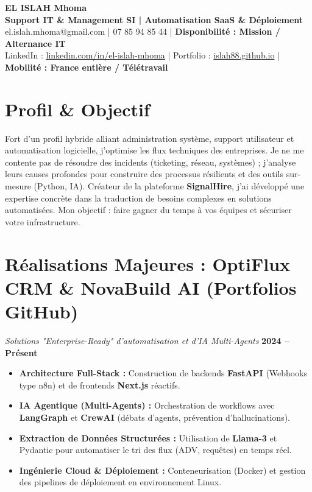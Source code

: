 \documentclass[10pt,a4paper]{article}
\begin{document}
\color{DarkGrey}

\begin{center}
    {\Huge \textbf{EL ISLAH Mhoma}}\\[0.1em] 
    {\large \textbf{\textcolor{UpClearBlue}{Support IT \& Management SI | Automatisation SaaS \& Déploiement}}}\\[0.2em]
    \small el.islah.mhoma@gmail.com | 07 85 94 85 44 | \textbf{Disponibilité : Mission / Alternance IT} \\
    \small LinkedIn : \href{https://linkedin.com/in/el-islah-mhoma/}{linkedin.com/in/el-islah-mhoma} | Portfolio : \href{https://islah88.github.io/}{islah88.github.io} | \textbf{Mobilité : France entière / Télétravail}
\end{center}
\vspace{0.1em}

\section*{Profil \& Objectif}
Fort d'un profil hybride alliant administration système, support utilisateur et automatisation logicielle, j'optimise les flux techniques des entreprises. Je ne me contente pas de résoudre des incidents (ticketing, réseau, systèmes) ; j'analyse leurs causes profondes pour construire des processus résilients et des outils sur-mesure (Python, IA). Créateur de la plateforme \textbf{SignalHire}, j'ai développé une expertise concrète dans la traduction de besoins complexes en solutions automatisées. Mon objectif : faire gagner du temps à vos équipes et sécuriser votre infrastructure.

\section*{Réalisations Majeures : OptiFlux CRM \& NovaBuild AI (Portfolios GitHub)}
\textit{Solutions "Enterprise-Ready" d'automatisation et d'IA Multi-Agents} \hfill \textbf{2024 -- Présent}
\begin{itemize}[leftmargin=1.5em, nosep, topsep=0.1em]
    \item \textbf{Architecture Full-Stack :} Construction de backends \textbf{FastAPI} (Webhooks type n8n) et de frontends \textbf{Next.js} réactifs.
    \item \textbf{IA Agentique (Multi-Agents) :} Orchestration de workflows avec \textbf{LangGraph} et \textbf{CrewAI} (débats d'agents, prévention d'hallucinations).
    \item \textbf{Extraction de Données Structurées :} Utilisation de \textbf{Llama-3} et Pydantic pour automatiser le tri des flux (ADV, requêtes) en temps réel.
    \item \textbf{Ingénierie Cloud \& Déploiement :} Conteneurisation (Docker) et gestion des pipelines de déploiement en environnement Linux.
\end{itemize}
\end{document}
